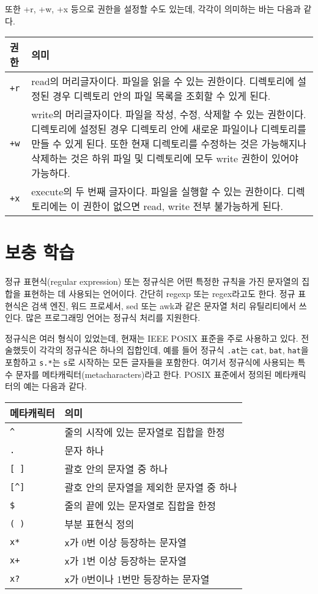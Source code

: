 \documentclass[runningheads]{../../../llncs}
\begin{document}
또한 +r, +w, +x 등으로 권한을 설정할 수도 있는데, 각각이 의미하는 바는 다음과 같다.

\begin{tabularx}{\textwidth}{l|X}
	권한 & 의미 \\
	\hline
	\texttt{+r} & read의 머리글자이다. 파일을 읽을 수 있는 권한이다. 디렉토리에 설정된 경우 디렉토리 안의 파일 목록을 조회할 수 있게 된다. \\
	\texttt{+w} & write의 머리글자이다. 파일을 작성, 수정, 삭제할 수 있는 권한이다. 디렉토리에 설정된 경우 디렉토리 안에 새로운 파일이나 디렉토리를 만들 수 있게 된다. 또한 현재 디렉토리를 수정하는 것은 가능해지나 삭제하는 것은 하위 파일 및 디렉토리에 모두 write 권한이 있어야 가능하다. \\
	\texttt{+x} & execute의 두 번째 글자이다. 파일을 실행할 수 있는 권한이다. 디렉토리에는 이 권한이 없으면 read, write 전부 불가능하게 된다.
\end{tabularx}

\section{보충 학습}
정규 표현식(regular expression) 또는 정규식은 어떤 특정한 규칙을 가진 문자열의 집합을 표현하는 데 사용되는 언어이다. 간단히 regexp 또는 regex라고도 한다. 정규 표현식은 검색 엔진, 워드 프로세서, sed 또는 awk과 같은 문자열 처리 유틸리티에서 쓰인다. 많은 프로그래밍 언어는 정규식 처리를 지원한다.

정규식은 여러 형식이 있었는데, 현재는 IEEE POSIX 표준을 주로 사용하고 있다. 전술했듯이 각각의 정규식은 하나의 집합인데, 예를 들어 정규식 \texttt{.at}는 \texttt{cat}, \texttt{bat}, \texttt{hat}을 포함하고 \texttt{s.*}는 \texttt{s}로 시작하는 모든 글자들을 포함한다. 여기서 정규식에 사용되는 특수 문자를 메타캐릭터(metacharacters)라고 한다. POSIX 표준에서 정의된 메타캐릭터의 예는 다음과 같다.

\begin{tabularx}{\textwidth}{l|X}
	메타캐릭터 & 의미 \\
	\hline
	\texttt{\textasciicircum} & 줄의 시작에 있는 문자열로 집합을 한정 \\
	\texttt{.} & 문자 하나 \\
	\texttt{[ ]} & 괄호 안의 문자열 중 하나 \\
	\texttt{[\textasciicircum\space]} & 괄호 안의 문자열을 제외한 문자열 중 하나 \\
	\texttt{\$} & 줄의 끝에 있는 문자열로 집합을 한정 \\
	\texttt{( )} & 부분 표현식 정의 \\
	\texttt{x*} & \texttt{x}가 0번 이상 등장하는 문자열 \\
	\texttt{x+} & \texttt{x}가 1번 이상 등장하는 문자열 \\
	\texttt{x?} & \texttt{x}가 0번이나 1번만 등장하는 문자열 \\
\end{tabularx}
\end{document}
